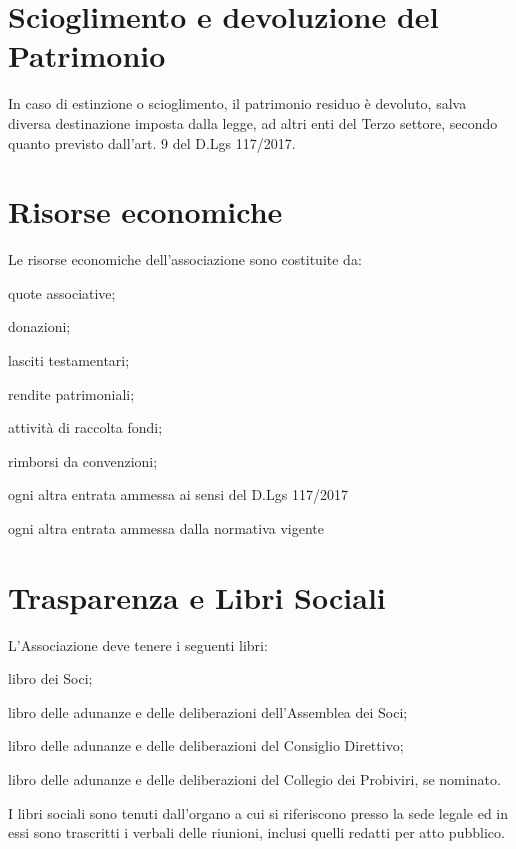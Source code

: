\documentclass[legalpaper, 11pt]{exam}
\let\tempone\enumerate
\let\temptwo\endenumerate
\renewenvironment{enumerate}{\tempone\addtolength{\itemsep}{-0.45\baselineskip}}{\temptwo}
\begin{document}
\section{Scioglimento e devoluzione del Patrimonio}
\begin{enumerate}
 \item In caso di estinzione o scioglimento, il patrimonio residuo è devoluto, salva diversa destinazione imposta dalla legge, ad altri enti del Terzo settore, secondo quanto previsto dall'art. 9 del D.Lgs 117/2017.
\end{enumerate}

\section{Risorse economiche}

\begin{enumerate}
 \item Le risorse economiche dell'associazione sono costituite da:
 \vspace{-5pt}
 \begin{enumerate}
  \item quote associative;
  \item donazioni;
  \item lasciti testamentari;
  \item rendite patrimoniali;
  \item attività di raccolta fondi;
  \item rimborsi da convenzioni;
  \item ogni altra entrata ammessa ai sensi del D.Lgs 117/2017
  \item ogni altra entrata ammessa dalla normativa vigente
 \end{enumerate}
\end{enumerate}


\section{Trasparenza e Libri Sociali}
\begin{enumerate}
 \item L'Associazione deve tenere i seguenti libri: 
 \vspace{-5pt}
 \begin{enumerate}
  \item libro dei Soci;
  \item libro delle adunanze e delle deliberazioni dell'Assemblea dei Soci;
  \item libro delle adunanze e delle deliberazioni del Consiglio Direttivo;
  \item libro delle adunanze e delle deliberazioni del Collegio dei Probiviri, se nominato.
 \end{enumerate}
 
 \item I libri sociali sono tenuti dall'organo a cui si riferiscono presso la sede legale ed in essi sono trascritti i verbali delle riunioni, inclusi quelli redatti per atto pubblico.
\end{enumerate}
\end{document}

